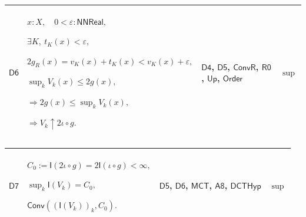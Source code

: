 \documentclass[11pt]{amsart}
\newlength{\FTCFourColumnBody}
\begin{document}
{\noindent
\begin{tabular}{|@{}>{\centering\arraybackslash}m{0.078431\FTCFourColumnBody}|>{\centering\arraybackslash}m{0.535947\FTCFourColumnBody}|>{\centering\arraybackslash}m{0.281045\FTCFourColumnBody}|>{\centering\arraybackslash}m{0.104575\FTCFourColumnBody}|}\hline
\hypertarget{dct:D6}{$\displaystyle \textsf{D6}$} & $\displaystyle x:X,\quad0<\varepsilon:\textsf{NNReal},$\par
$\displaystyle \exists K,\ t_K(x)<\varepsilon,$\par
$\displaystyle 2g_R(x)=v_K(x)+t_K(x)<v_K(x)+\varepsilon,$\par
$\displaystyle \sup_k V_k(x)\le2g(x),$\par
$\displaystyle \Rightarrow2g(x)\le\sup_kV_k(x),$\par
$\displaystyle \Rightarrow V_k\uparrow2\iota\circ g.$ & \hyperlink{dct:D4}{$\displaystyle \textsf{D4}$}, \hyperlink{dct:D5}{$\displaystyle \textsf{D5}$}, \hyperlink{dctdef:ConvR}{$\displaystyle \textsf{ConvR}$}, \hyperlink{dct:R0}{$\displaystyle \textsf{R0}$}, \hyperlink{def:Up}{$\displaystyle \textsf{Up}$}, \hyperlink{ax:Order}{$\displaystyle \textsf{Order}$} & $\displaystyle \sup$\\ \hline
\end{tabular}%
\par\setlength{\parskip}{0pt}\nointerlineskip
\noindent
\begin{tabular}{|@{}>{\centering\arraybackslash}m{0.078431\FTCFourColumnBody}|>{\centering\arraybackslash}m{0.535947\FTCFourColumnBody}|>{\centering\arraybackslash}m{0.281045\FTCFourColumnBody}|>{\centering\arraybackslash}m{0.104575\FTCFourColumnBody}|}\hline
\hypertarget{dct:D7}{$\displaystyle \textsf{D7}$} & $\displaystyle C_0:=\textsf{I}(2\iota\circ g)=2\textsf{I}(\iota\circ g)<\infty,$\par
$\displaystyle \sup_k\textsf{I}(V_k)=C_0,$\par
$\displaystyle \textsf{Conv}((\textsf{I}(V_k))_k,C_0).$ & \hyperlink{dct:D5}{$\displaystyle \textsf{D5}$}, \hyperlink{dct:D6}{$\displaystyle \textsf{D6}$}, \hyperlink{lem:MCT}{$\displaystyle \textsf{MCT}$}, \hyperlink{dct:A8}{$\displaystyle \textsf{A8}$}, \hyperlink{dctdef:DCTHyp}{$\displaystyle \textsf{DCTHyp}$} & $\displaystyle \sup$\\ \hline
\end{tabular}%
\par\setlength{\parskip}{0pt}\nointerlineskip
\noindent
\begin{tabular}{|@{}>{\centering\arraybackslash}m{0.078431\FTCFourColumnBody}|>{\centering\arraybackslash}m{0.535947\FTCFourColumnBody}|>{\centering\arraybackslash}m{0.281045\FTCFourColumnBody}|>{\centering\arraybackslash}m{0.104575\FTCFourColumnBody}|}\hline

\end{tabular}}
\end{document}
